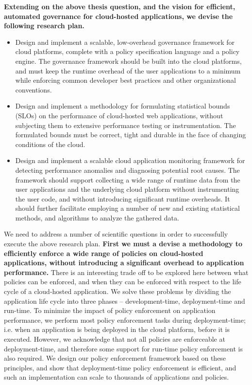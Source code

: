 \textbf{Extending on the above thesis question, and the vision for efficient, automated governance for
cloud-hosted applications, we devise the following research plan.}
\begin{itemize}
\item Design and implement a scalable, low-overhead governance framework for cloud platforms,
complete with a policy specification language and a policy engine. The governance framework should be
built into the cloud platforms, and must
keep the runtime overhead of the user applications to a minimum while enforcing
common developer best practices and other organizational conventions.
\item Design and implement a methodology for formulating statistical bounds (SLOs) on the
performance of cloud-hosted web applications, without
 subjecting them to extensive performance testing or instrumentation. The formulated
bounds must be correct, tight and durable in the face of changing
 conditions of the cloud.
 \item Design and implement a scalable cloud application monitoring framework for detecting
performance anomalies and diagnosing potential root causes. 
The framework should support collecting
 a wide range of runtime data from the user applications and the underlying cloud platform
 without instrumenting the user code, and without introducing significant runtime overheads.
 It should further facilitate employing a number of new and existing statistical methods,
 and algorithms to analyze the gathered data.
\end{itemize}

We need to address a number of scientific questions in order to successfully execute the 
above research plan. \textbf{First we must a devise a methodology to efficiently 
enforce a wide range of policies on cloud-hosted applications,
without introducing a significant overhead to application performance.} There is an interesting
trade off to be explored here between what policies can be enforced, and when they can be enforced with respect
to the life cycle of a cloud-hosted application. We solve these problems by dividing the application
life cycle into three phases -- development-time, deployment-time and run-time. To minimize the
impact of policy enforcement on application performance, we perform most policy
enforcement tasks during deployment-time; i.e. when an application is being deployed in the 
cloud platform, before it is executed. However, we acknowledge that not all policies
are enforceable at deployment-time, and therefore some support for run-time policy enforcement
is also required. We design our policy enforcement framework based on these principles, and 
show that deployment-time policy enforcement is efficient, and such an implementation can scale
to thousands of applications and policies.

